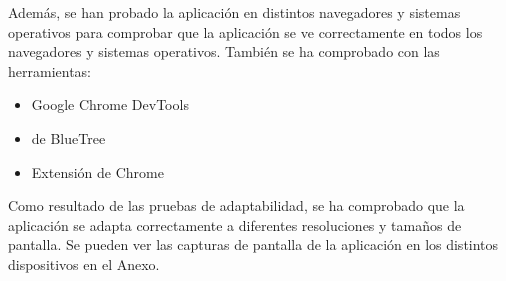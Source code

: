 Además, se han probado la aplicación en distintos navegadores y sistemas operativos para comprobar que la aplicación se ve correctamente en todos los navegadores y sistemas operativos.
También se ha comprobado con las herramientas:
\begin{itemize}
			\item Google Chrome DevTools
			\item {} de BlueTree
			\item Extensión de Chrome 
\end{itemize}

Como resultado de las pruebas de adaptabilidad, se ha comprobado que la aplicación se adapta correctamente a diferentes resoluciones y tamaños de pantalla.
Se pueden ver las capturas de pantalla de la aplicación en los distintos dispositivos en el Anexo.